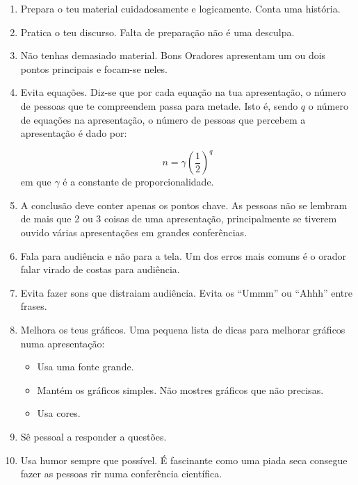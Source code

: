 \documentclass[12pt]{article}
\begin{document}
\begin{enumerate}

\item Prepara o teu material cuidadosamente e logicamente. Conta uma história.

\item Pratica o teu discurso. Falta de preparação não é uma desculpa.

\item Não tenhas demasiado material. Bons Oradores apresentam um ou dois pontos principais e focam-se neles.

\item Evita equações. Diz-se que por cada equação na tua apresentação, o número de pessoas que te compreendem passa para metade. Isto é, sendo $q$ o número de equações na apresentação, o número de pessoas que percebem a apresentação é dado por:

\begin{equation}
n = \gamma \left( \frac{1}{2} \right)^q
\end{equation}
em 	que $\gamma$ é a constante de proporcionalidade.

\item A conclusão deve conter apenas os pontos chave. As pessoas não se lembram de mais que 2 ou 3 coisas de uma apresentação, principalmente se tiverem ouvido várias apresentações em grandes conferências.

\item Fala para audiência e não para a tela. Um dos erros mais comuns é o orador falar virado de costas para audiência. 

\item Evita fazer sons que distraiam audiência. Evita os ``Ummm'' ou ``Ahhh'' entre frases.

\item Melhora os teus gráficos. Uma pequena lista de dicas para melhorar gráficos numa apresentação:

\begin{itemize}
\item Usa uma fonte grande.

\item Mantém os gráficos simples. Não mostres gráficos que não precisas.

\item Usa cores.

\end{itemize}

\item Sê pessoal a responder a questões.

\item Usa humor sempre que possível. É fascinante como uma piada seca consegue fazer as pessoas rir numa conferência científica.

\end{enumerate}
\end{document}
